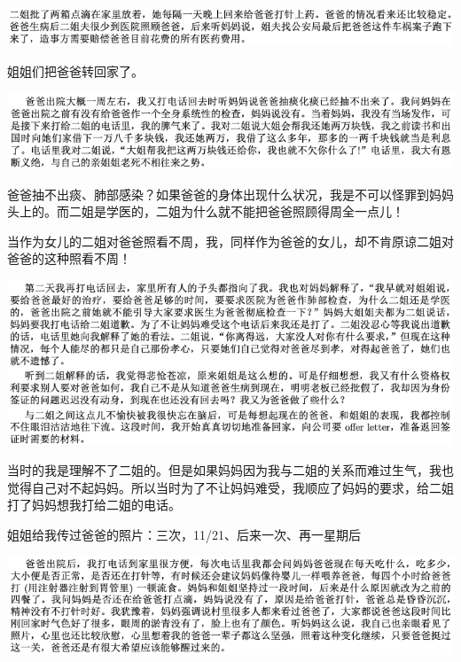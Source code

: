 \documentclass[9pt, b5paper]{article}
\begin{document}
\begin{center}
\includegraphics[width=.9\linewidth]{./pic/backups_plans_20210416_162127.png}
\end{center}

姐姐们把爸爸转回家了。 

\begin{center}
\includegraphics[width=.9\linewidth]{./pic/backups_plans_20210416_162200.png}
\end{center}

爸爸抽不出痰、肺部感染？如果爸爸的身体出现什么状况，我是不可以怪罪到妈妈头上的。而二姐是学医的，二姐为什么就不能把爸爸照顾得周全一点儿！

当作为女儿的二姐对爸爸照看不周，我，同样作为爸爸的女儿，却不肯原谅二姐对爸爸的这种照看不周！

\begin{center}
\includegraphics[width=.9\linewidth]{./pic/backups_plans_20210416_162408.png}
\end{center}

当时的我是理解不了二姐的。但是如果妈妈因为我与二姐的关系而难过生气，我也觉得自己对不起妈妈。所以当时为了不让妈妈难受，我顺应了妈妈的要求，给二姐打了妈妈想我打给二姐的电话。

姐姐给我传过爸爸的照片：三次，11/21、后来一次、再一星期后

\begin{center}
\includegraphics[width=.9\linewidth]{./pic/backups_plans_20210416_162738.png}
\end{center}
\end{document}
